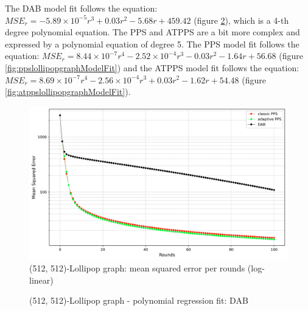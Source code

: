 The DAB model fit follows the equation: $MSE_r=-5.89\times10^{-5}r^{3}+0.03r^{2}-5.68r+459.42$ (figure \ref{fig:dablollipopgraphModelFit}), which is a 4-th degree polynomial equation. The PPS and ATPPS are a bit more complex and expressed by a polynomial equation of degree 5. The PPS model fit follows the equation: $MSE_r=8.44\times 10^{-7}r^{4}-2.52\times 10^{-4}r^{3}-0.03r^{2}-1.64r+56.68$ (figure \ref{fig:ppslollipopgraphModelFit}) and the ATPPS model fit follows the equation: $MSE_r=8.69 \times 10^{-7}r^{4}-2.56 \times 10^{-4}r^{3}+0.03r^{2}-1.62r+54.48$ (figure \ref{fig:atppslollipopgraphModelFit}).

\begin{figure}[]
    \centering
    \includegraphics[width=\linewidth]{figures/Simulation_outcomes/LollipopGraph/512_512/DAB_vs_PPS_LG_r100_n1024_averaged_log.png}
    \caption{(512, 512)-Lollipop graph: mean squared error per rounds (log-linear)}
    \label{fig:lollipopgraphMSEperRoundLogLog}
\end{figure}

\begin{figure}[]
    \centering
    \caption{(512, 512)-Lollipop graph - polynomial regression fit: DAB}
    \label{fig:dablollipopgraphModelFit}
\end{figure}

